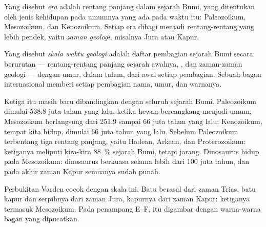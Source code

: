 \begin{definition}\label{def:g7:geological-time:era-period}
Yang disebut \emph{era} adalah rentang panjang dalam sejarah
Bumi, yang ditentukan oleh jenis kehidupan pada umumnya yang ada pada waktu
itu: Paleozoikum, Mesozoikum, dan Kenozoikum. Setiap era dibagi menjadi
rentang-rentang yang lebih pendek, yaitu \emph{zaman geologi},
misalnya Jura atau Kapur.
\end{definition}

\begin{definition}\label{def:g7:geological-time:time-scale}
Yang disebut \emph{skala waktu geologi} adalah
daftar pembagian sejarah Bumi secara berurutan --- rentang-rentang panjang
sejarah awalnya, , dan zaman-zaman geologi --- dengan umur, dalam
tahun, dari awal setiap pembagian. Sebuah bagan internasional memberi
setiap pembagian nama, umur, dan warnanya.
\end{definition}


Ketiga  itu masih baru dibandingkan dengan seluruh sejarah Bumi. 
Paleozoikum dimulai \num{538.8} juta tahun yang lalu, ketika  hewan
bercangkang menjadi umum;  Mesozoikum berlangsung dari \num{251.9}
sampai \num{66} juta tahun yang lalu;  Kenozoikum,  tempat kita
hidup, dimulai \num{66} juta tahun yang lalu. Sebelum Paleozoikum
terbentang tiga rentang panjang, yaitu Hadean, Arkean, dan Proterozoikum:
ketiganya meliputi kira-kira 88~\% sejarah Bumi, tetapi  jarang. Dinosaurus hidup pada  Mesozoikum: dinosaurus berkuasa
selama lebih dari \num{100} juta tahun, dan pada akhir zaman Kapur
semuanya sudah punah.

Perbukitan Varden cocok dengan skala ini. Batu  berasal dari zaman
Trias, batu kapur dan serpihnya dari zaman Jura, kapurnya dari zaman Kapur:
ketiganya termasuk  Mesozoikum. Pada penampang E--F,  itu
digambar dengan warna-warna bagan yang dipucatkan.

